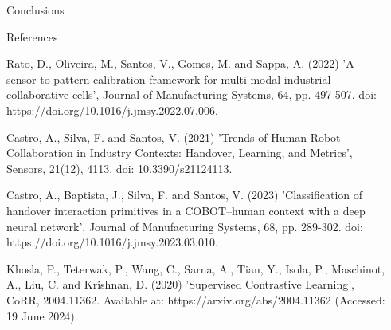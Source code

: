 \documentclass[final]{beamer}
\newlength{\sepwidth}
\newlength{\colwidth}
\newcommand{\separatorcolumn}{\begin{column}{\sepwidth}\end{column}}
\begin{document}
\begin{frame}[t]
\begin{columns}[t]
\begin{column}{\colwidth}
\begin{block}{Conclusions}
  \end{block}


  \begin{block}{References}

    \scriptsize

    Rato, D., Oliveira, M., Santos, V., Gomes, M. and Sappa, A. (2022) 'A sensor-to-pattern calibration framework for multi-modal industrial collaborative cells', Journal of Manufacturing Systems, 64, pp. 497-507. doi: https://doi.org/10.1016/j.jmsy.2022.07.006.

    Castro, A., Silva, F. and Santos, V. (2021) 'Trends of Human-Robot Collaboration in Industry Contexts: Handover, Learning, and Metrics', Sensors, 21(12), 4113. doi: 10.3390/s21124113.

    Castro, A., Baptista, J., Silva, F. and Santos, V. (2023) 'Classification of handover interaction primitives in a COBOT–human context with a deep neural network', Journal of Manufacturing Systems, 68, pp. 289-302. doi: https://doi.org/10.1016/j.jmsy.2023.03.010.

    Khosla, P., Teterwak, P., Wang, C., Sarna, A., Tian, Y., Isola, P., Maschinot, A., Liu, C. and Krishnan, D. (2020) 'Supervised Contrastive Learning', CoRR, 2004.11362. Available at: https://arxiv.org/abs/2004.11362 (Accessed: 19 June 2024).


  \end{block}

\end{column}

\separatorcolumn
\end{columns}
\end{frame}
\end{document}
